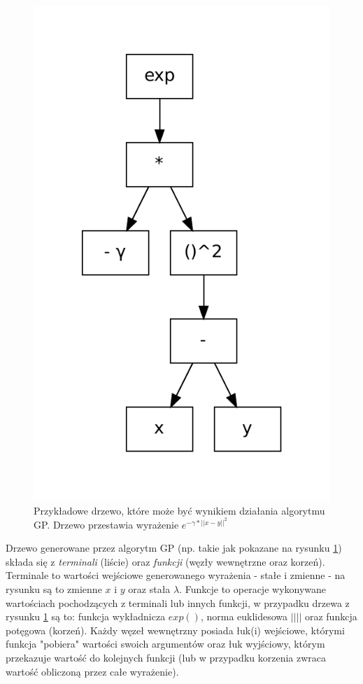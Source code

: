 \begin{figure}[h]
\centering
\includegraphics[scale=0.6]{figures/graphs/2-tree}
\caption{Przykładowe drzewo, które może być wynikiem działania algorytmu GP. Drzewo przestawia wyrażenie $ e^{-\gamma*||x-y||^2} $ \label{fig:2-tree}}
\end{figure}

Drzewo generowane przez algorytm GP (np. takie jak pokazane na rysunku \ref{fig:2-tree})  składa się z \emph{terminali} (liście) oraz \emph{funkcji} (węzły wewnętrzne oraz korzeń). Terminale to wartości wejściowe generowanego wyrażenia - stałe i zmienne - na rysunku są to zmienne $ x $ i $ y $ oraz stała $ \lambda $. Funkcje to operacje wykonywane wartościach pochodzących z terminali lub innych funkcji, w przypadku drzewa z rysunku \ref{fig:2-tree} są to: funkcja wykładnicza $ exp() $, norma euklidesowa $ || || $ oraz funkcja potęgowa (korzeń). Każdy węzeł wewnętrzny posiada łuk(i) wejściowe, którymi funkcja "pobiera" wartości swoich argumentów oraz łuk wyjściowy, którym przekazuje wartość do kolejnych funkcji (lub w przypadku korzenia zwraca wartość obliczoną przez całe wyrażenie).

